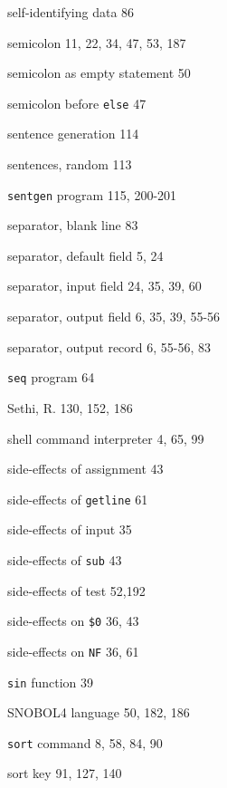 \begin{multicols}{3}
\hangindent=3pc  self-identifying data 86

\hangindent=3pc  semicolon 11, 22, 34, 47, 53, 187

\hangindent=3pc  semicolon as empty statement 50

\hangindent=3pc  semicolon before \verb'else' 47

\hangindent=3pc  sentence generation 114

\hangindent=3pc  sentences, random 113

\hangindent=3pc  \verb'sentgen' program 115, 200-201

\hangindent=3pc  separator, blank line 83

\hangindent=3pc  separator, default field 5, 24

\hangindent=3pc  separator, input field 24, 35, 39, 60

\hangindent=3pc  separator, output field 6, 35, 39, 55-56

\hangindent=3pc  separator, output record 6, 55-56,  83

\hangindent=3pc  \verb'seq' program 64

\hangindent=3pc  Sethi, R. 130, 152, 186

\hangindent=3pc  shell command interpreter 4, 65, 99

\hangindent=3pc  side-effects of assignment 43

\hangindent=3pc  side-effects of \verb'getline' 61

\hangindent=3pc  side-effects of input 35

\hangindent=3pc  side-effects of \verb'sub' 43

\hangindent=3pc  side-effects of test 52,192

\hangindent=3pc  side-effects on \verb'$0' 36, 43

\hangindent=3pc  side-effects on \verb'NF' 36, 61

\hangindent=3pc  \verb'sin' function 39

\hangindent=3pc  SNOBOL4 language 50, 182, 186

\hangindent=3pc  \verb'sort' command 8, 58, 84, 90

\hangindent=3pc  sort key 91, 127, 140


\end{multicols}
